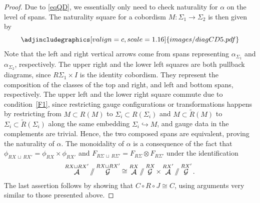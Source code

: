 \documentclass[10pt,a4paper]{amsart}
\DeclareMathOperator{\cala}{\mathcal{A}}
\DeclareMathOperator{\calg}{\mathcal{G}}
\newcommand{\sslash}{\mathbin{/\mkern-6mu/}}
\numberwithin{equation}{section}
\theoremstyle{definition}
\begin{document}
\begin{proof}
 Due to \eqref{eqQD}, we essentially only need to check naturality for $\alpha$ on the level of spans. The naturality square for a cobordism $M\colon \Sigma_1 \rightarrow \Sigma_2$ is then given by
 \[
 \centering
 \adjincludegraphics[valign=c, scale = 1.16]{images/diagCD5.pdf}
 \]
 Note that the left and right vertical arrows come from spans representing $\alpha_{\Sigma_1}$ and $\alpha_{\Sigma_2}$, respectively. The upper right and the lower left squares are both pullback diagrams, since $R\Sigma_1 \times I$ is the identity cobordism. They represent the composition of the classes of the top and right, and left and bottom spans, respectively. The upper left and the lower right square commute due to condition~\ref{F1}, since restricting gauge configurations or transformations happens by restricting from $M \subset R(M)$ to $\Sigma_i \subset R(\Sigma_i)$ and $M \subset \widetilde R(M)$ to $\Sigma_i \subset \widetilde R(\Sigma_i)$ along the same embedding $\Sigma_i \hookrightarrow M$, and gauge data in the complements are trivial. Hence, the two composed spans are equivalent, proving the naturality of $\alpha$. The monoidality of $\alpha$ is a consequence of the fact that $\phi_{RX \, \sqcup \,RX'} = \phi_{RX} \times \phi_{R X'}$ and $F_{R\Sigma \, \sqcup \, R\Sigma'} = F_{R\Sigma} \otimes F_{R \Sigma'}$ under the identification
 \begin{align*}
 \cala^{RX \sqcup RX'} \sslash \calg^{RX \sqcup RX'} \cong \cala^{RX} \sslash \calg^{RX} \times \cala^{RX'} \sslash \calg^{RX'}.
 \end{align*}
 The last assertion follows by showing that $C \circ R \circ J \cong C$, using arguments very similar to those presented above.
\end{proof}
\end{document}
